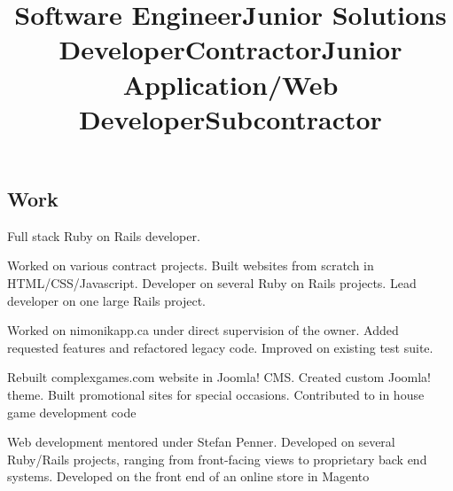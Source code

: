 \documentclass[margin,line,letterpaper]{resume}
\begin{document}
\begin{resume}
  \section{\mysidestyle Work}

  \title{\bf Software Engineer}
  \location{ }
  \begin{position}
    Full stack Ruby on Rails developer.
  \end{position}

  \title{\bf Junior Solutions Developer}
  \location{}
  \begin{position}
    Worked on various contract projects. Built websites from scratch
    in HTML/CSS/Javascript. Developer on several Ruby on Rails
    projects. Lead developer on one large Rails project.
  \end{position}

  \title{\bf Contractor}
  \location{ }
  \begin{position}
    Worked on nimonikapp.ca under direct supervision of the owner.
    Added requested features and refactored legacy code. Improved
    on existing test suite. 
  \end{position}

  \title{\bf Junior Application/Web Developer}
  \location{ }
  \begin{position}
    Rebuilt complexgames.com website in Joomla! CMS. Created custom Joomla! theme. Built promotional sites for special occasions. Contributed to in house game development code
  \end{position}

  \title{\bf Subcontractor}
  \location{ }
  \begin{position}
    Web development mentored under Stefan Penner. Developed on several Ruby/Rails projects, ranging from front-facing views to proprietary back end systems. Developed on the front end of an online store in Magento
  \end{position}
\end{resume}
\end{document}
